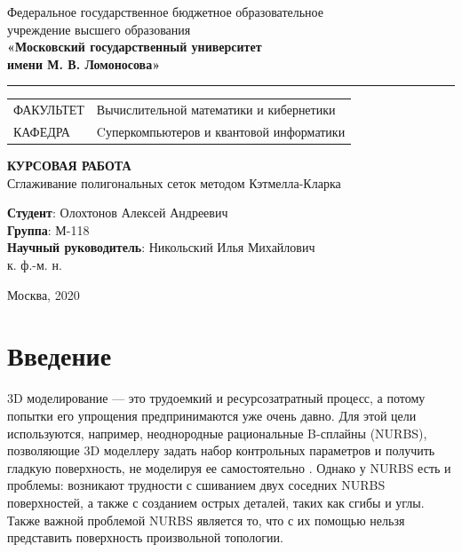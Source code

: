 \documentclass[14pt]{extarticle}
\begin{document}
{
  \centering

  Федеральное государственное бюджетное образовательное\\ учреждение высшего образования\\
  \textbf{«Московский государственный университет\\ имени М. В. Ломоносова»}
  
  \noindent\rule{\textwidth}{1pt}
}

\noindent\begin{tabular}{@{}l l}
ФАКУЛЬТЕТ & Вычислительной математики и кибернетики\\
КАФЕДРА   & Cуперкомпьютеров и квантовой информатики 
\end{tabular}

\vfill

\begin{center}
  \centering
  \Large{\textbf{КУРСОВАЯ РАБОТА}}\\
  Сглаживание полигональных сеток методом Кэтмелла-Кларка
\end{center}

\vfill

\begin{flushright}
  \textbf{Студент}: Олохтонов Алексей Андреевич\\
  \textbf{Группа}: М-118\\
  \textbf{Научный руководитель}:
  Никольский Илья Михайлович\\
  к. ф.-м. н.
\end{flushright}

\begin{center}
  Москва, 2020
\end{center}

\thispagestyle{empty}

\newpage

\tableofcontents

\newpage

\section{Введение}
3D моделирование --- это трудоемкий и ресурсозатратный процесс, а потому попытки его упрощения предпринимаются уже очень давно. Для этой цели используются, например, неоднородные рациональные B-сплайны (NURBS), позволяющие 3D моделлеру задать набор контрольных параметров и получить гладкую поверхность, не моделируя ее самостоятельно \cite{rogers01}. Однако у NURBS есть и проблемы: возникают трудности с сшиванием двух соседних NURBS поверхностей, а также с созданием острых деталей, таких как сгибы и
углы. Также важной проблемой NURBS является то, что с их помощью нельзя представить поверхность произвольной топологии.
\end{document}
